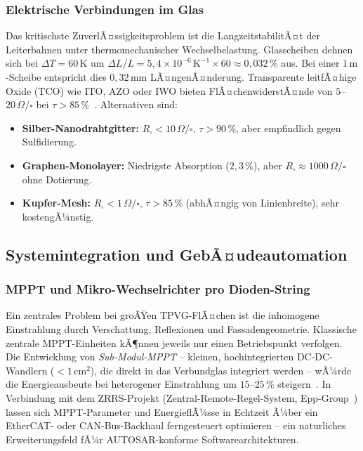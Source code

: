 ﻿\documentclass[a4paper,12pt]{article}
\theoremstyle{definition}
\theoremstyle{remark}
\begin{document}
\subsubsection{Elektrische Verbindungen im Glas}
Das kritischste ZuverlÃ¤ssigkeitsproblem ist die LangzeitstabilitÃ¤t der
Leiterbahnen unter thermomechanischer Wechselbelastung. Glasscheiben
dehnen sich bei $\Delta T = 60\,\mathrm{K}$ um $\Delta L/L = 5{,}4 \times 10^{-6}\,\mathrm{K^{-1}} \times 60 \approx 0{,}032\,\%$ aus. Bei einer
$1\,\mathrm{m}$-Scheibe entspricht dies $0{,}32\,\mathrm{mm}$ LÃ¤ngenÃ¤nderung.
Transparente leitfÃ¤hige Oxide (TCO) wie ITO, AZO oder IWO bieten
FlÃ¤chenwiderstÃ¤nde von $5$--$20\,\Omega/\square$ bei
$\tau > 85\,\%$~\cite{Granqvist2014}. Alternativen sind:
\begin{itemize}
  \item \textbf{Silber-Nanodrahtgitter:} $R_\square < 10\,\Omega/\square$,
    $\tau > 90\,\%$, aber empfindlich gegen Sulfidierung.
  \item \textbf{Graphen-Monolayer:} Niedrigste Absorption ($2{,}3\,\%$),
    aber $R_\square \approx 1000\,\Omega/\square$ ohne Dotierung.
  \item \textbf{Kupfer-Mesh:} $R_\square < 1\,\Omega/\square$,
    $\tau > 85\,\%$ (abhÃ¤ngig von Linienbreite), sehr kostengÃ¼nstig.
\end{itemize}

\subsection{Systemintegration und GebÃ¤udeautomation}

\subsubsection{MPPT und Mikro-Wechselrichter pro Dioden-String}
Ein zentrales Problem bei groÃŸen TPVG-FlÃ¤chen ist die inhomogene
Einstrahlung durch Verschattung, Reflexionen und Fassadengeometrie.
Klassische zentrale MPPT-Einheiten kÃ¶nnen jeweils nur einen Betriebspunkt
verfolgen. Die Entwicklung von \emph{Sub-Modul-MPPT} -- kleinen,
hochintegrierten DC-DC-Wandlern ($< 1\,\mathrm{cm^2}$), die direkt
in das Verbundglas integriert werden -- wÃ¼rde die Energieausbeute bei
heterogener Einstrahlung um $15$--$25\,\%$ steigern~\cite{Balato2015}.
In Verbindung mit dem ZRRS-Projekt (Zentral-Remote-Regel-System,
Epp-Group~\cite{Epp2026ZRRS}) lassen sich MPPT-Parameter und
EnergieflÃ¼sse in Echtzeit Ã¼ber ein EtherCAT- oder CAN-Bus-Backhaul
ferngesteuert optimieren -- ein naturliches Erweiterungsfeld fÃ¼r
AUTOSAR-konforme Softwarearchitekturen.
\end{document}
